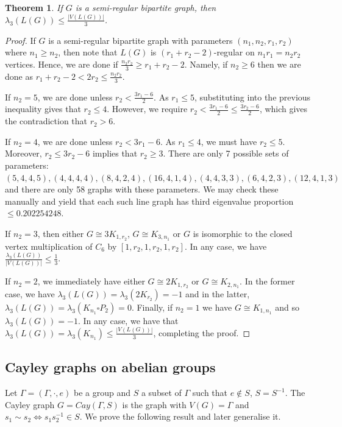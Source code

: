 \documentclass[12pt]{article}
\newtheorem{thm}{Theorem}[section]
\begin{document}
\begin{thm} If $G$ is a semi-regular bipartite graph, then $\lambda_3(L(G)) \le \frac{|V(L(G))|}{3}$.
\end{thm}
\begin{proof} If $G$ is a semi-regular bipartite graph with parameters $(n_1,n_2,r_1,r_2)$ where $n_1\ge n_2$, then note that $L(G)$ is $(r_1+r_2-2)$-regular on $n_1r_1 = n_2r_2$ vertices. Hence, we are done if $\frac{n_2r_2}{3} \ge r_1 + r_2 - 2$. Namely, if $n_2 \ge 6$ then we are done as $r_1+r_2-2 < 2r_2 \le \frac{n_2 r_2}{3}$. 

If $n_2=5$, we are done unless $r_2 < \frac{3r_1-6}{2}$. As $r_1\le 5$, substituting into the previous inequality gives that $r_2\le 4$. However, we require $r_2 < \frac{3r_1-6}{2} \le \frac{3r_2-6}{2}$, which gives the contradiction that $r_2> 6$. 

If $n_2=4$, we are done unless $r_2 < 3r_1-6$. As $r_1\le 4$, we must have $r_2\le 5$. Moreover, $r_2\le 3r_2-6$ implies that $r_2\ge 3$. There are only 7 possible sets of parameters: $(5,4,4,5),(4,4,4,4),(8,4,2,4),(16,4,1,4),(4,4,3,3),(6,4,2,3),(12,4,1,3)$ and there are only 58 graphs with these parameters. We may check these manually and yield that each such line graph has third eigenvalue proportion $\le 0.202254248$.

If $n_2 = 3$, then either $G\cong 3K_{1,r_2}$, $G\cong K_{3,n_1}$ or $G$ is isomorphic to the closed vertex multiplication of $C_6$ by $[1,r_2,1,r_2,1,r_2]$. In any case, we have $\frac{\lambda_3(L(G))}{|V(L(G))|}\le \frac{1}{3}$. 

If $n_2 = 2$, we immediately have either $G\cong 2K_{1,r_2}$ or $G\cong K_{2,n_1}$. In the former case, we have $\lambda_3(L(G)) = \lambda_3(2K_{r_2}) = -1$ and in the latter, $\lambda_3(L(G)) = \lambda_3(K_{n_1} \square P_2)= 0$. Finally, if $n_2 = 1$ we have $G\cong K_{1,n_1}$ and so $\lambda_3(L(G))= - 1$. In any case, we have that $\lambda_3(L(G))=\lambda_3(K_{n_1})\le \frac{|V(L(G))|}{3}$, completing the proof.
\end{proof}

\subsection{Cayley graphs on abelian groups}

Let $\Gamma = (\Gamma, \cdot, e)$ be a group and $S$ a subset of $\Gamma$ such that $e \not \in S$, $S = S^{-1}$. The Cayley graph $G = Cay(\Gamma, S)$ is the graph with $V(G) = \Gamma$ and $s_1 \sim s_2 \iff s_1s_2^{-1} \in S$. We prove the following result and later generalise it.
\end{document}
